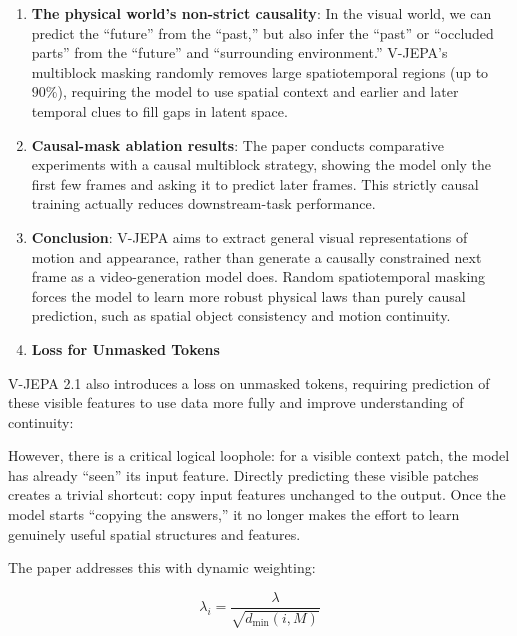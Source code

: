 \begin{enumerate}
\def\labelenumi{\arabic{enumi}.}
\item
  \textbf{The physical world's non-strict causality}: In the visual world, we can predict the ``future'' from the ``past,'' but also infer the ``past'' or ``occluded parts'' from the ``future'' and ``surrounding environment.'' V-JEPA's multiblock masking randomly removes large spatiotemporal regions (up to \(90\%\)), requiring the model to use spatial context and earlier and later temporal clues to fill gaps in latent space.
\item
  \textbf{Causal-mask ablation results}: The paper conducts comparative experiments with a causal multiblock strategy, showing the model only the first few frames and asking it to predict later frames. This strictly causal training actually reduces downstream-task performance.
\item
  \textbf{Conclusion}: V-JEPA aims to extract general visual representations of motion and appearance, rather than generate a causally constrained next frame as a video-generation model does. Random spatiotemporal masking forces the model to learn more robust physical laws than purely causal prediction, such as spatial object consistency and motion continuity.
\item
  \textbf{Loss for Unmasked Tokens}
\end{enumerate}

V-JEPA 2.1 also introduces a loss on unmasked tokens, requiring prediction of these visible features to use data more fully and improve understanding of continuity:

However, there is a critical logical loophole: for a visible context patch, the model has already ``seen'' its input feature. Directly predicting these visible patches creates a trivial shortcut: copy input features unchanged to the output. Once the model starts ``copying the answers,'' it no longer makes the effort to learn genuinely useful spatial structures and features.

The paper addresses this with dynamic weighting:

\[
\lambda_i = \frac{\lambda}{\sqrt{d_{\min}(i, M)}}
\]

